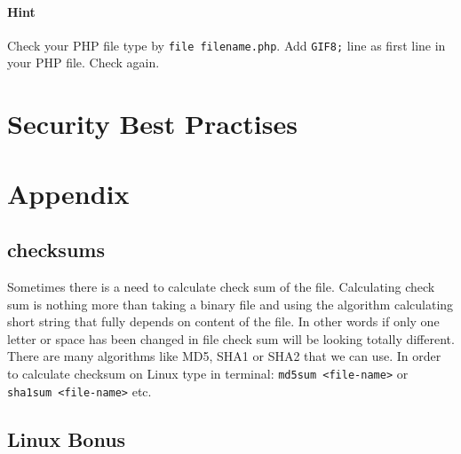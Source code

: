 \documentclass{article}[12pt]
\begin{document}
\paragraph{Hint} Check your PHP file type by \texttt{file filename.php}. Add \texttt{GIF8;} line as first line in your PHP file. Check again.



\section{Security Best Practises}








\section{Appendix}

\subsection{checksums}
Sometimes there is a need to calculate check sum of the file. Calculating check sum is nothing more than
taking a binary file and using the algorithm calculating short string that fully depends on content of the file. In other words
if only one letter or space has been changed in file check sum will be looking totally different. There are many algorithms like MD5, SHA1 or SHA2 that we can use. In order to calculate checksum on Linux type in terminal:
\texttt{md5sum <file-name>} or \texttt{sha1sum <file-name>} etc.


\subsection{Linux Bonus}
\end{document}
